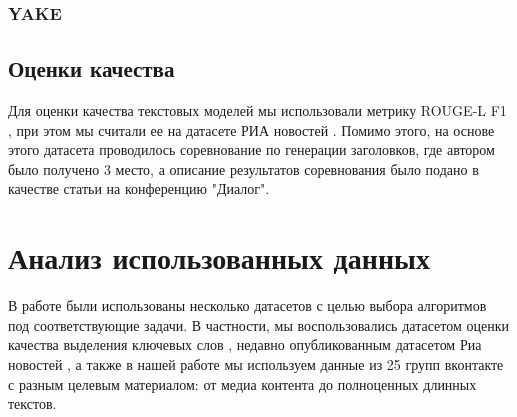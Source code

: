 \documentclass[aps,%
12pt,%
final,%
oneside,
onecolumn,%
musixtex, %
superscriptaddress,%
centertags]{article} %
\begin{document}
%

\subsubsection{YAKE}


\subsection{Оценки качества}
Для оценки качества текстовых моделей мы использовали метрику ROUGE-L F1 \cite{Lin:2004},
при этом мы считали ее на датасете РИА новостей \cite{gavrilov2018self}. Помимо этого,
на основе этого датасета проводилось соревнование по генерации заголовков, где автором было
получено 3 место, а описание результатов соревнования было подано в качестве статьи на конференцию
"Диалог".



\section{Анализ использованных данных}

В работе были использованы несколько датасетов с целью выбора алгоритмов под соответствующие задачи.
В частности, мы воспользовались датасетом оценки качества выделения ключевых слов \cite{mannefedov2019}, недавно
опубликованным датасетом Риа новостей \cite{gavrilov2018self}, а также в нашей работе мы используем
данные из 25 групп вконтакте с разным целевым материалом: от медиа контента до полноценных длинных
текстов.
\end{document}
